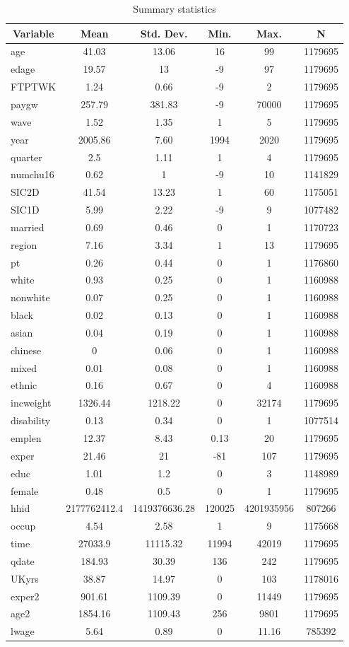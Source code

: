 
\begin{table}[htbp]\centering \caption{Summary statistics \label{sumstats}}
\begin{tabular}{l c c c c c}\hline\hline
\multicolumn{1}{c}{\textbf{Variable}} & \textbf{Mean}
 & \textbf{Std. Dev.}& \textbf{Min.} &  \textbf{Max.} & \textbf{N}\\ \hline
age & 41.03 & 13.06 & 16 & 99 & 1179695\\
edage & 19.57 & 13 & -9 & 97 & 1179695\\
FTPTWK & 1.24 & 0.66 & -9 & 2 & 1179695\\
paygw & 257.79 & 381.83 & -9 & 70000 & 1179695\\
wave & 1.52 & 1.35 & 1 & 5 & 1179695\\
year & 2005.86 & 7.60 & 1994 & 2020 & 1179695\\
quarter & 2.5 & 1.11 & 1 & 4 & 1179695\\
numchu16 & 0.62 & 1 & -9 & 10 & 1141829\\
SIC2D & 41.54 & 13.23 & 1 & 60 & 1175051\\
SIC1D & 5.99 & 2.22 & -9 & 9 & 1077482\\
married & 0.69 & 0.46 & 0 & 1 & 1170723\\
region & 7.16 & 3.34 & 1 & 13 & 1179695\\
pt & 0.26 & 0.44 & 0 & 1 & 1176860\\
white & 0.93 & 0.25 & 0 & 1 & 1160988\\
nonwhite & 0.07 & 0.25 & 0 & 1 & 1160988\\
black & 0.02 & 0.13 & 0 & 1 & 1160988\\
asian & 0.04 & 0.19 & 0 & 1 & 1160988\\
chinese & 0 & 0.06 & 0 & 1 & 1160988\\
mixed & 0.01 & 0.08 & 0 & 1 & 1160988\\
ethnic & 0.16 & 0.67 & 0 & 4 & 1160988\\
incweight & 1326.44 & 1218.22 & 0 & 32174 & 1179695\\
disability & 0.13 & 0.34 & 0 & 1 & 1077514\\
emplen & 12.37 & 8.43 & 0.13 & 20 & 1179695\\
exper & 21.46 & 21 & -81 & 107 & 1179695\\
educ & 1.01 & 1.2 & 0 & 3 & 1148989\\
female & 0.48 & 0.5 & 0 & 1 & 1179695\\
hhid & 2177762412.4 & 1419376636.28 & 120025 & 4201935956 & 807266\\
occup & 4.54 & 2.58 & 1 & 9 & 1175668\\
time & 27033.9 & 11115.32 & 11994 & 42019 & 1179695\\
qdate & 184.93 & 30.39 & 136 & 242 & 1179695\\
UKyrs & 38.87 & 14.97 & 0 & 103 & 1178016\\
exper2 & 901.61 & 1109.39 & 0 & 11449 & 1179695\\
age2 & 1854.16 & 1109.43 & 256 & 9801 & 1179695\\
lwage & 5.64 & 0.89 & 0 & 11.16 & 785392\\
\hline\end{tabular}
\label{tab:sumstats}
\end{table}
